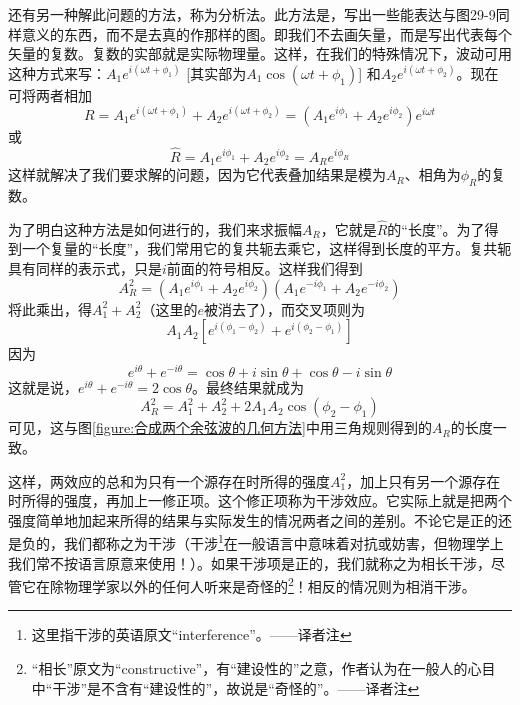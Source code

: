 还有另一种解此问题的方法，称为分析法。此方法是，写出一些能表达与图29-9同样意义的东西，而不是去真的作那样的图。即我们不去画矢量，而是写出代表每个矢量的复数。复数的实部就是实际物理量。这样，在我们的特殊情况下，波动可用这种方式来写：$A_1e^{i(\omega t + \phi_1)}$ [其实部为$A_1\cos(\omega t+\phi_1)$] 和$A_2e^{i(\omega t +\phi_2)}$。现在可将两者相加
\begin{equation}
    \label{Eq:I:29:13}
    R=A_1e^{i(\omega t + \phi_1)} + A_2e^{i(\omega t + \phi_2)} = (A_1e^{i\phi_1} + A_2e^{i\phi_2})e^{i\omega t}
\end{equation}
或
\begin{equation}
    \label{Eq:I:29:14}
    \hat{R} = A_1e^{i\phi_1} + A_2e^{i\phi_2} = A_Re^{i\phi_R}
\end{equation}
这样就解决了我们要求解的问题，因为它代表叠加结果是模为$A_R$、相角为$\phi_R$的复数。

为了明白这种方法是如何进行的，我们来求振幅$A_R$，它就是$\hat{R}$的“长度”。为了得到一个复量的“长度”，我们常用它的复共轭去乘它，这样得到长度的平方。复共轭具有同样的表示式，只是$i$前面的符号相反。这样我们得到
\begin{equation}
    \label{Eq:I:29:15}
    A_R^2 = (A_1e^{i\phi_1} + A_2e^{i\phi_2})(A_1e^{-i\phi_1} + A_2e^{-i\phi_2})
\end{equation}
将此乘出，得$A_1^2 + A_2^2$（这里的$e$被消去了），而交叉项则为
\begin{equation*}
    A_1A_2[e^{i(\phi_1-\phi_2)}+e^{i(\phi_2-\phi_1)}]
\end{equation*}
因为
\begin{equation*}
    e^{i\theta} + e^{-i\theta} = \cos\theta + i\sin\theta + \cos\theta - i\sin\theta
\end{equation*}
这就是说，$e^{i\theta}+e^{-i\theta}=2\cos\theta$。最终结果就成为
\begin{equation}
    \label{Eq:I:29:16}
    A_R^2=A_1^2+A_2^2 + 2A_1A_2\cos(\phi_2 - \phi_1)
\end{equation}
可见，这与图\ref{figure:合成两个余弦波的几何方法}中用三角规则得到的$A_R$的长度一致。

这样，两效应的总和为只有一个源存在时所得的强度$A_1^2$，加上只有另一个源存在时所得的强度，再加上一修正项。这个修正项称为干涉效应。它实际上就是把两个强度简单地加起来所得的结果与实际发生的情况两者之间的差别。不论它是正的还是负的，我们都称之为干涉（干涉\footnote{这里指干涉的英语原文“interference”。——译者注}在一般语言中意味着对抗或妨害，但物理学上我们常不按语言原意来使用！）。如果干涉项是正的，我们就称之为相长干涉，尽管它在除物理学家以外的任何人听来是奇怪的\footnote{“相长”原文为“constructive”，有“建设性的”之意，作者认为在一般人的心目中“干涉”是不含有“建设性的”，故说是“奇怪的”。——译者注}！相反的情况则为相消干涉。

